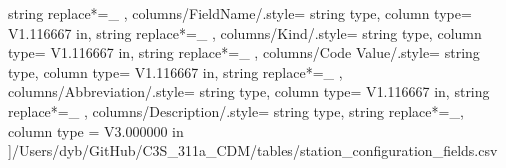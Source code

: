 \begin{landscape}
{            string replace*={_}{}
        },
    columns/FieldName/.style={
            string type, 
            column type= V{1.116667 in}, 
            string replace*={_}{}
        },
    columns/Kind/.style={
            string type, 
            column type= V{1.116667 in}, 
            string replace*={_}{}
        },
    columns/Code Value/.style={
            string type, 
            column type= V{1.116667 in}, 
            string replace*={_}{}
        },
    columns/Abbreviation/.style={
            string type, 
            column type= V{1.116667 in}, 
            string replace*={_}{}
        },
    columns/Description/.style={
            string type, 
            string replace*={_}{},
            column type = V{3.000000 in}
        }
    ]{/Users/dyb/GitHub/C3S_311a_CDM/tables/station_configuration_fields.csv}
\end{landscape}
